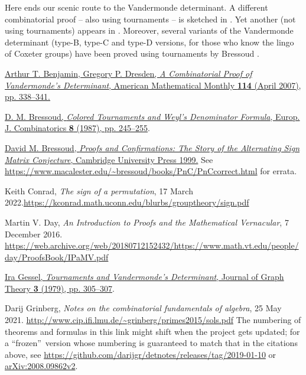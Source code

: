 \documentclass[numbers=enddot,12pt,final,onecolumn,notitlepage]{scrartcl}%
\numberwithin{exer}{subsection}
\theoremstyle{definition}
\begin{document}
Here ends our scenic route to the Vandermonde determinant. A different
combinatorial proof -- also using tournaments -- is sketched in
\cite[Exercises 2.4.1--2.4.6]{Bresso99}. Yet another (not using tournaments)
appears in \cite{BenDre07}. Moreover, several variants of the Vandermonde
determinant (type-B, type-C and type-D versions, for those who know the lingo
of Coxeter groups) have been proved using tournaments by Bressoud
\cite{Bresso87}.

\begin{thebibliography}{99999999}                                                                                         %


%
\href{https://scholarship.claremont.edu/hmc_fac_pub/524/}{Arthur T. Benjamin,
Gregory P. Dresden, \textit{A Combinatorial Proof of Vandermonde's
Determinant}, American Mathematical Monthly \textbf{114} (April 2007), pp.
338--341.}

%
\href{https://doi.org/10.1016/S0195-6698(87)80028-8}{D. M. Bressoud,
\textit{Colored Tournaments and Weyl's Denominator Formula}, Europ. J.
Combinatorics \textbf{8} (1987), pp. 245--255}.

%
\href{https://doi.org/10.1017/CBO9780511613449}{David M. Bressoud,
\textit{Proofs and Confirmations: The Story of the Alternating Sign Matrix
Conjecture}, Cambridge University Press 1999.} See
\url{https://www.macalester.edu/~bressoud/books/PnC/PnCcorrect.html} for errata.

Keith Conrad, \textit{The sign of a permutation}, 17
March 2022.\newline\url{https://kconrad.math.uconn.edu/blurbs/grouptheory/sign.pdf}

Martin V. Day, \textit{An Introduction to Proofs and the
Mathematical Vernacular}, 7 December 2016. \newline\url{https://web.archive.org/web/20180712152432/https://www.math.vt.edu/people/day/ProofsBook/IPaMV.pdf}

\href{https://doi.org/10.1002/jgt.3190030315}{Ira
Gessel, \textit{Tournaments and Vandermonde's Determinant}, Journal of Graph
Theory \textbf{3} (1979), pp. 305--307}.

Darij Grinberg, \textit{Notes on the combinatorial
fundamentals of algebra}, 25 May 2021.\newline%
\url{http://www.cip.ifi.lmu.de/~grinberg/primes2015/sols.pdf} \newline The
numbering of theorems and formulas in this link might shift when the project
gets updated; for a \textquotedblleft frozen\textquotedblright\ version whose
numbering is guaranteed to match that in the citations above, see
\url{https://github.com/darijgr/detnotes/releases/tag/2019-01-10} or
\href{https://arxiv.org/abs/2008.09862v2}{arXiv:2008.09862v2}.


\end{thebibliography}
\end{document}
